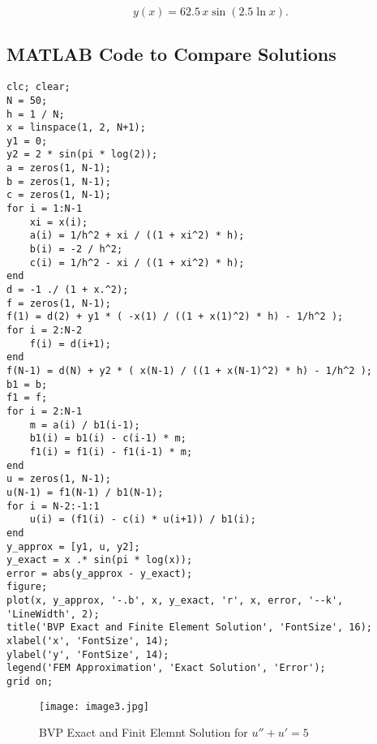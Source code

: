 \documentclass{article}
\begin{document}
\[
y(x) = 62.5 \, x \sin(2.5 \ln x).
\]

\subsection*{MATLAB Code to Compare Solutions}


\begin{tcolorbox}[title=Finite Element Method (Piecewise Linear Basis)]
\begin{lstlisting}
clc; clear;
N = 50;
h = 1 / N;
x = linspace(1, 2, N+1);
y1 = 0;
y2 = 2 * sin(pi * log(2));
a = zeros(1, N-1);
b = zeros(1, N-1);
c = zeros(1, N-1);
for i = 1:N-1
    xi = x(i);
    a(i) = 1/h^2 + xi / ((1 + xi^2) * h);
    b(i) = -2 / h^2;
    c(i) = 1/h^2 - xi / ((1 + xi^2) * h);
end
d = -1 ./ (1 + x.^2);
f = zeros(1, N-1);
f(1) = d(2) + y1 * ( -x(1) / ((1 + x(1)^2) * h) - 1/h^2 );
for i = 2:N-2
    f(i) = d(i+1);
end
f(N-1) = d(N) + y2 * ( x(N-1) / ((1 + x(N-1)^2) * h) - 1/h^2 );
b1 = b;
f1 = f;
for i = 2:N-1
    m = a(i) / b1(i-1);
    b1(i) = b1(i) - c(i-1) * m;
    f1(i) = f1(i) - f1(i-1) * m;
end
u = zeros(1, N-1);
u(N-1) = f1(N-1) / b1(N-1);
for i = N-2:-1:1
    u(i) = (f1(i) - c(i) * u(i+1)) / b1(i);
end
y_approx = [y1, u, y2];
y_exact = x .* sin(pi * log(x));
error = abs(y_approx - y_exact);
figure;
plot(x, y_approx, '-.b', x, y_exact, 'r', x, error, '--k', 'LineWidth', 2);
title('BVP Exact and Finite Element Solution', 'FontSize', 16);
xlabel('x', 'FontSize', 14);
ylabel('y', 'FontSize', 14);
legend('FEM Approximation', 'Exact Solution', 'Error');
grid on;
\end{lstlisting}
\end{tcolorbox}

\begin{figure}[h!]
    \centering
    \texttt{[image: image3.jpg]}
    \caption{BVP Exact and Finit Elemnt Solution for $u'' + u' = 5$}
    \label{fig:fem_solution}
\end{figure}
\end{document}
